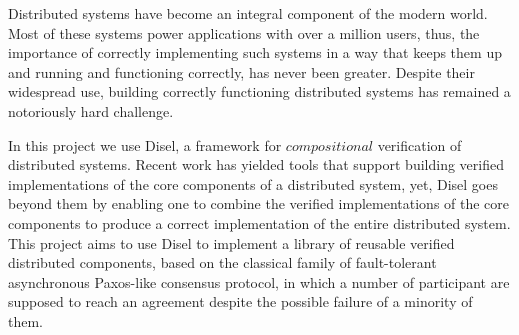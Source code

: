 Distributed systems have become an integral component of the modern world.
Most of these systems power applications with over a million users, thus,
the importance of correctly implementing such systems in a way that keeps them up and
running and functioning correctly, has never been greater.
Despite their widespread use, building correctly functioning distributed systems
has remained a notoriously hard challenge.

In this project we use Disel, a framework for $compositional$ verification
of distributed systems. Recent work has yielded tools that support building
verified implementations of the core components of a distributed system, yet,
Disel goes beyond them by enabling one to combine
the verified implementations of the core components to produce a
correct implementation of the entire distributed system.
This project aims to use Disel to implement a library of reusable
verified distributed components, based on the classical family of
fault-tolerant asynchronous Paxos-like consensus protocol, in which
a number of participant are supposed to reach
an agreement despite the possible failure of a minority of them.
